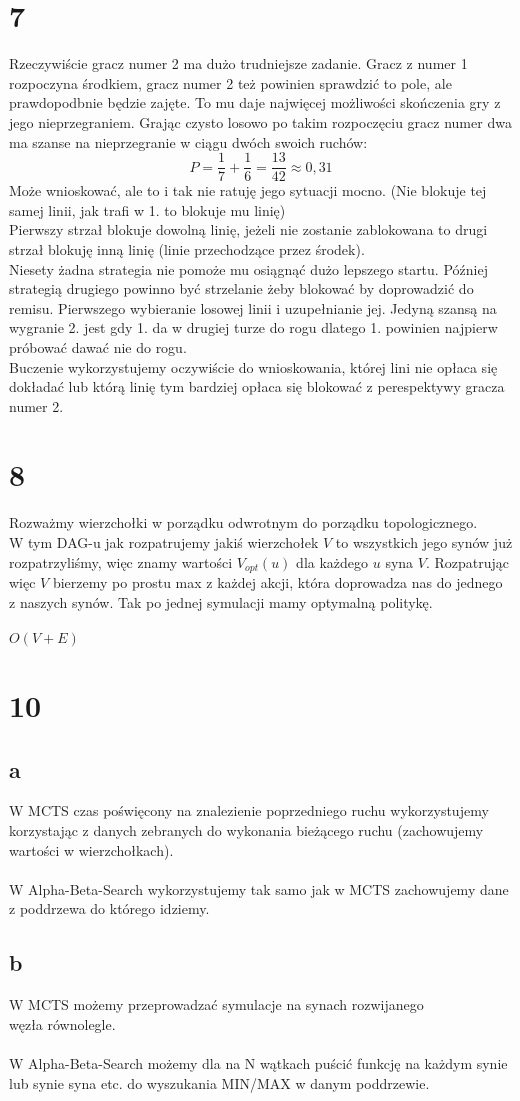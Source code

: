 \documentclass{article}
\begin{document}
\section{7}
Rzeczywiście gracz numer 2 ma dużo trudniejsze zadanie. Gracz z numer 1 rozpoczyna środkiem, gracz numer 2 też powinien sprawdzić to pole, ale prawdopodbnie będzie zajęte. To mu daje najwięcej możliwości skończenia gry z jego nieprzegraniem. Grając czysto losowo po takim rozpoczęciu gracz numer dwa ma szanse na nieprzegranie w ciągu dwóch swoich ruchów: $$P = \frac{1}{7} + \frac{1}{6} = \frac{13}{42} \approx 0,31$$
Może wnioskować, ale to i tak nie ratuję jego sytuacji mocno. (Nie blokuje tej samej linii, jak trafi w 1. to blokuje mu linię)\\
Pierwszy strzał blokuje dowolną linię, jeżeli nie zostanie zablokowana to drugi strzał blokuję inną linię (linie przechodzące przez środek).\\
Niesety żadna strategia nie pomoże mu osiągnąć dużo lepszego startu. Później strategią drugiego powinno być strzelanie żeby blokować by doprowadzić do remisu. Pierwszego wybieranie losowej linii i uzupełnianie jej. Jedyną szansą na wygranie 2. jest gdy 1. da w drugiej turze do rogu dlatego 1. powinien najpierw próbować dawać nie do rogu.\\Buczenie wykorzystujemy oczywiście do wnioskowania, której lini nie opłaca się dokładać lub którą linię tym bardziej opłaca się blokować z perespektywy gracza numer 2.
\section{8}
Rozważmy wierzchołki w porządku odwrotnym do porządku topologicznego.\\W tym DAG-u jak rozpatrujemy jakiś wierzchołek $V$ to wszystkich jego synów już rozpatrzyliśmy, więc znamy wartości $V_{opt}(u)$ dla każdego $u$ syna $V$. Rozpatrując więc $V$ bierzemy po prostu max z każdej akcji, która doprowadza nas do jednego z naszych synów. Tak po jednej symulacji mamy optymalną politykę. \\\\$O(V+E)$\\
\section{10}
\subsection*{a}
W MCTS czas poświęcony na znalezienie poprzedniego ruchu wykorzystujemy korzystając z danych zebranych do wykonania bieżącego ruchu (zachowujemy wartości w wierzchołkach).\\\\
W Alpha-Beta-Search wykorzystujemy tak samo jak w MCTS zachowujemy dane z poddrzewa do którego idziemy.
\subsection*{b}
W MCTS możemy przeprowadzać symulacje na synach rozwijanego \\węzła równolegle.\\\\
W Alpha-Beta-Search możemy dla na N wątkach puścić funkcję na każdym synie lub synie syna etc. do wyszukania MIN/MAX w danym poddrzewie.
\end{document}
